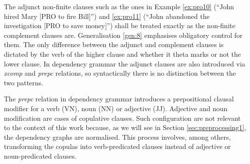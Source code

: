 
    The adjunct non-finite clauses such as the ones in Example \ref{ex:pro10} (``John hired Mary [PRO to fire Bill]'') and \ref{ex:pro11} (``John abandoned the investigation [PRO to save money]'') shall be treated exactly as the non-finite complement clauses are. Generalisation \ref{gen:8} emphasises obligatory control for them. The only difference between the adjunct and complement clauses is dictated by the verb of the higher clause and whether it theta marks or not the lower clause. In dependency grammar the adjunct clauses are also introduced via \textit{xcomp} and \textit{prepc} relations, so syntactically there is no distinction between the two patterns.


    The \textit{prepc} relation in dependency grammar introduces a prepositional clausal modifier for a verb (VN), noun (NN) or adjective (JJ). Adjective and noun modification are cases of copulative clauses. Such configuration are not relevant to the context of this work  because, as we will see in Section \ref{sec:preprocessing1}, the dependency graphs are normalised. This process involves, among others, transforming the copulas into verb-predicated clauses instead of adjective or noun-predicated clauses. 

